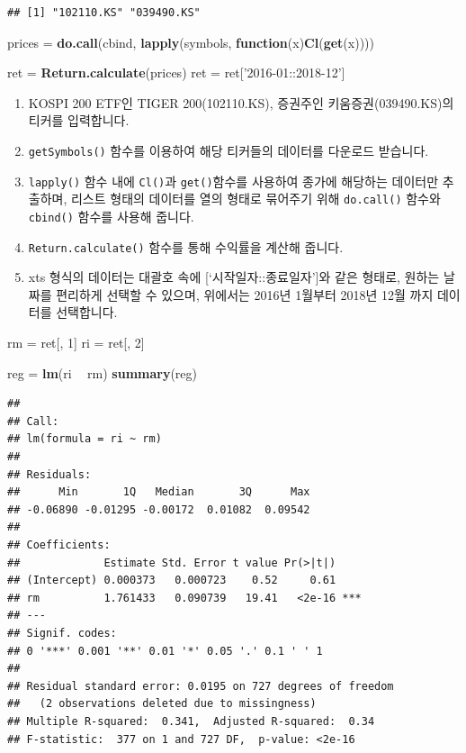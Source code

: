 \documentclass[12pt,]{book}
\newenvironment{Shaded}{\begin{snugshade}}{\end{snugshade}}
\newcommand{\ControlFlowTok}[1]{\textcolor[rgb]{0.13,0.29,0.53}{\textbf{#1}}}
\newcommand{\DecValTok}[1]{\textcolor[rgb]{0.00,0.00,0.81}{#1}}
\newcommand{\KeywordTok}[1]{\textcolor[rgb]{0.13,0.29,0.53}{\textbf{#1}}}
\newcommand{\NormalTok}[1]{#1}
\newcommand{\OperatorTok}[1]{\textcolor[rgb]{0.81,0.36,0.00}{\textbf{#1}}}
\newcommand{\StringTok}[1]{\textcolor[rgb]{0.31,0.60,0.02}{#1}}
\providecommand{\tightlist}{%
  \setlength{\itemsep}{0pt}\setlength{\parskip}{0pt}}
\begin{document}
\begin{verbatim}
## [1] "102110.KS" "039490.KS"
\end{verbatim}

\begin{Shaded}
\begin{Highlighting}[]
\NormalTok{prices =}\StringTok{ }\KeywordTok{do.call}\NormalTok{(cbind,}
                 \KeywordTok{lapply}\NormalTok{(symbols, }\ControlFlowTok{function}\NormalTok{(x)}\KeywordTok{Cl}\NormalTok{(}\KeywordTok{get}\NormalTok{(x))))}

\NormalTok{ret =}\StringTok{ }\KeywordTok{Return.calculate}\NormalTok{(prices)}
\NormalTok{ret =}\StringTok{ }\NormalTok{ret[}\StringTok{'2016-01::2018-12'}\NormalTok{]}
\end{Highlighting}
\end{Shaded}

\begin{enumerate}
\def\labelenumi{\arabic{enumi}.}
\tightlist
\item
  KOSPI 200 ETF인 TIGER 200(102110.KS), 증권주인 키움증권(039490.KS)의 티커를 입력합니다.
\item
  \texttt{getSymbols()} 함수를 이용하여 해당 티커들의 데이터를 다운로드 받습니다.
\item
  \texttt{lapply()} 함수 내에 \texttt{Cl()}과 \texttt{get()}함수를 사용하여 종가에 해당하는 데이터만 추출하며, 리스트 형태의 데이터를 열의 형태로 묶어주기 위해 \texttt{do.call()} 함수와 \texttt{cbind()} 함수를 사용해 줍니다.
\item
  \texttt{Return.calculate()} 함수를 통해 수익률을 계산해 줍니다.
\item
  xts 형식의 데이터는 대괄호 속에 {[}`시작일자::종료일자'{]}와 같은 형태로, 원하는 날짜를 편리하게 선택할 수 있으며, 위에서는 2016년 1월부터 2018년 12월 까지 데이터를 선택합니다.
\end{enumerate}

\begin{Shaded}
\begin{Highlighting}[]
\NormalTok{rm =}\StringTok{ }\NormalTok{ret[, }\DecValTok{1}\NormalTok{]}
\NormalTok{ri =}\StringTok{ }\NormalTok{ret[, }\DecValTok{2}\NormalTok{]}

\NormalTok{reg =}\StringTok{ }\KeywordTok{lm}\NormalTok{(ri }\OperatorTok{~}\StringTok{ }\NormalTok{rm)}
\KeywordTok{summary}\NormalTok{(reg)}
\end{Highlighting}
\end{Shaded}

\begin{verbatim}
## 
## Call:
## lm(formula = ri ~ rm)
## 
## Residuals:
##      Min       1Q   Median       3Q      Max 
## -0.06890 -0.01295 -0.00172  0.01082  0.09542 
## 
## Coefficients:
##             Estimate Std. Error t value Pr(>|t|)    
## (Intercept) 0.000373   0.000723    0.52     0.61    
## rm          1.761433   0.090739   19.41   <2e-16 ***
## ---
## Signif. codes:  
## 0 '***' 0.001 '**' 0.01 '*' 0.05 '.' 0.1 ' ' 1
## 
## Residual standard error: 0.0195 on 727 degrees of freedom
##   (2 observations deleted due to missingness)
## Multiple R-squared:  0.341,  Adjusted R-squared:  0.34 
## F-statistic:  377 on 1 and 727 DF,  p-value: <2e-16
\end{verbatim}
\end{document}
